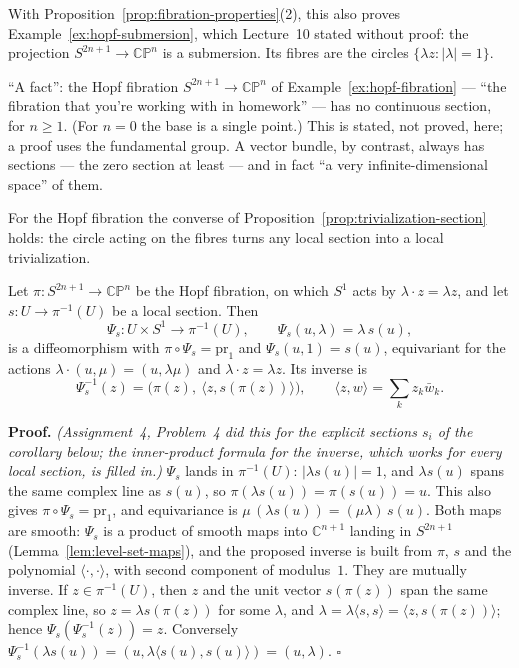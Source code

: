 \documentclass[11pt]{report}
\makeatletter
\newcounter{thmcounter}[section]
\renewenvironment{proof}[1][Proof]{\noindent\textbf{#1.} }{\hfill$\square$\par\vspace{5pt}}
\newcommand{\thmlabel}[1]{\edef\@currentlabel{\arabic{section}.\arabic{thmcounter}}\label{#1}}
\makeatother
\begin{document}
With Proposition~\ref{prop:fibration-properties}(2), this also proves Example~\ref{ex:hopf-submersion}, which Lecture~10 stated without proof: the projection $S^{2n+1} \to \mathbb{CP}^n$ is a submersion. Its fibres are the circles $\{\lambda z : |\lambda| = 1\}$.

\begin{rembox}\label{rem:sections-need-not-exist}
``A fact'': the Hopf fibration $S^{2n+1} \to \mathbb{CP}^n$ of Example~\ref{ex:hopf-fibration} --- ``the fibration that you're working with in homework'' --- has no continuous section, for $n \ge 1$. (For $n = 0$ the base is a single point.) This is stated, not proved, here; a proof uses the fundamental group. A vector bundle, by contrast, always has sections --- the zero section at least --- and in fact ``a very infinite-dimensional space'' of them.
\end{rembox}

For the Hopf fibration the converse of Proposition~\ref{prop:trivialization-section} holds: the circle acting on the fibres turns any local section into a local trivialization.

\begin{propbox}\thmlabel{prop:hopf-section-trivialization}
Let $\pi : S^{2n+1} \to \mathbb{CP}^n$ be the Hopf fibration, on which $S^1$ acts by $\lambda \cdot z = \lambda z$, and let $s : U \to \pi^{-1}(U)$ be a local section. Then
\[
\Psi_s : U \times S^1 \longrightarrow \pi^{-1}(U), \qquad \Psi_s(u, \lambda) = \lambda\, s(u),
\]
is a diffeomorphism with $\pi \circ \Psi_s = \mathrm{pr}_1$ and $\Psi_s(u, 1) = s(u)$, equivariant for the actions $\lambda \cdot (u, \mu) = (u, \lambda\mu)$ and $\lambda \cdot z = \lambda z$. Its inverse is
\[
\Psi_s^{-1}(z) = \Big( \pi(z),\ \big\langle z, s(\pi(z)) \big\rangle \Big), \qquad \langle z, w \rangle = \textstyle\sum_k z_k \bar w_k .
\]
\end{propbox}

\begin{proof}
\textit{(Assignment~4, Problem~4 did this for the explicit sections $s_i$ of the corollary below; the inner-product formula for the inverse, which works for every local section, is filled in.)} $\Psi_s$ lands in $\pi^{-1}(U)$: $|\lambda s(u)| = 1$, and $\lambda s(u)$ spans the same complex line as $s(u)$, so $\pi(\lambda s(u)) = \pi(s(u)) = u$. This also gives $\pi \circ \Psi_s = \mathrm{pr}_1$, and equivariance is $\mu\,(\lambda s(u)) = (\mu\lambda)\, s(u)$. Both maps are smooth: $\Psi_s$ is a product of smooth maps into $\mathbb{C}^{n+1}$ landing in $S^{2n+1}$ (Lemma~\ref{lem:level-set-maps}), and the proposed inverse is built from $\pi$, $s$ and the polynomial $\langle \cdot, \cdot \rangle$, with second component of modulus~$1$. They are mutually inverse. If $z \in \pi^{-1}(U)$, then $z$ and the unit vector $s(\pi(z))$ span the same complex line, so $z = \lambda s(\pi(z))$ for some $\lambda$, and $\lambda = \lambda \langle s, s \rangle = \langle z, s(\pi(z)) \rangle$; hence $\Psi_s(\Psi_s^{-1}(z)) = z$. Conversely $\Psi_s^{-1}(\lambda s(u)) = (u, \lambda \langle s(u), s(u) \rangle) = (u, \lambda)$.
\end{proof}
\end{document}
